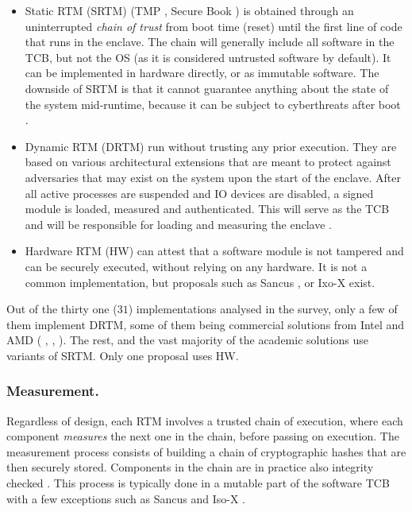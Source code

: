 \documentclass[runningheads,a4paper]{uwsese}
\begin{document}
\begin{itemize}
    \item Static RTM (SRTM) (TMP \cite{tee_tcg_arch_overview},
        Secure Book \cite{windows-driver-content2023Dec}) is obtained
        through an uninterrupted \emph{chain of trust} from boot time
        (reset) until the first line of code that runs in the enclave. The
        chain will generally include all software in the TCB, but not the
        OS (as it is considered untrusted software by default). It can be
        implemented in hardware directly, or as immutable software. The
        downside of SRTM is that it cannot guarantee anything about the
        state of the system mid-runtime, because it can be subject to
        cyberthreats after boot \cite{tee_smart_rot} \cite{tee_hw_sup}.
    \item Dynamic RTM (DRTM) run without trusting any prior execution. They are
        based on various architectural extensions that are meant to protect
        against adversaries that may exist on the system upon the start of the
        enclave. After all active processes are suspended and IO devices are
        disabled, a signed module is loaded, measured and authenticated. This
        will serve as the TCB and will be responsible for loading and measuring
        the enclave \cite{tee_hw_sup}.
    \item Hardware RTM (HW) can attest that a software module is not tampered
        and can be securely executed, without relying on any hardware. It is
        not a common implementation, but proposals such as Sancus
        \cite{tee_sancus}, or Ixo-X \cite{tee_isox} exist. 
\end{itemize}

Out of the thirty one ($31$) implementations analysed in the survey, only a few of 
them implement DRTM, some of them being commercial solutions from Intel and AMD (
\cite{arm_tz}, \cite{intel_tdx}, \cite{intel_sgx}). The rest, and the
vast majority of the academic solutions use variants of SRTM. Only one proposal
uses HW.

\subsubsection{Measurement.}

Regardless of design, each RTM involves a trusted chain of execution, where
each component \emph{measures} the next one in the chain, before passing on
execution. The measurement process consists of building a chain of
cryptographic hashes that are then securely stored. Components in the chain are
in practice also integrity checked \cite{tee_hw_sup}. This process is typically
done in a mutable part of the software TCB with a few exceptions
\label{hw_exp} such as Sancus \cite{tee_sancus} and Iso-X
\cite{tee_isox}.
\end{document}
